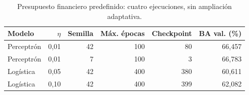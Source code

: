 \begin{table}[htbp]
\centering\small
\caption{Presupuesto financiero predefinido: cuatro ejecuciones, sin ampliación adaptativa.}\label{tab:tf-config}
\begin{tabular}{lrrrrr}\toprule
Modelo & $\eta$ & Semilla & Máx. épocas & Checkpoint & BA val. (\%) \\ \midrule
Perceptrón & 0,01 & 42 & 100 & 80 & 66,457 \\
Perceptrón & 0,01 & 7 & 100 & 3 & 66,783 \\
Logística & 0,05 & 42 & 400 & 380 & 60,611 \\
Logística & 0,10 & 42 & 400 & 399 & 62,082 \\
\bottomrule\end{tabular}
\end{table}

